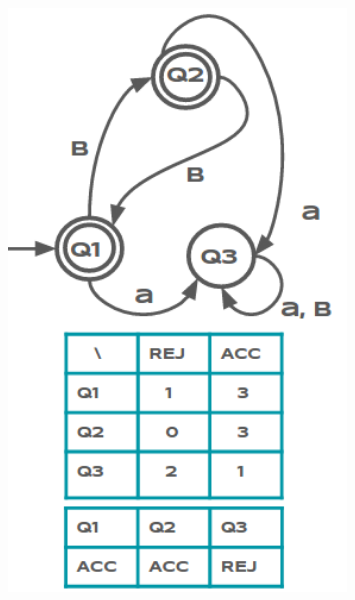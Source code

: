 \documentclass{mini}
\begin{document}
\begin{figure}[H]
\begin{minipage}{.3\textwidth}
  \includegraphics[width=0.8\textwidth]{./images/hc_example_2.png}
\caption{}
\label{fig:smart_state_example_2}
\end{minipage}\hfill
\begin{minipage}{.3\textwidth}
\centering

\end{minipage}
\end{figure}
\end{document}
